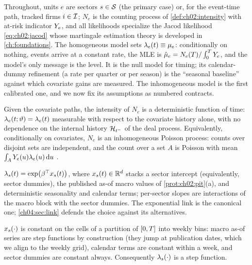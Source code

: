 Throughout, units $e$ are sectors $s \in \mathcal{S}$ (the primary case) or,
for the event-time path, tracked firms $i \in \mathcal{I}$; $N_e$ is the
counting process of \cref{def:ch02:intensity} with at-risk indicator
$Y_e$, and all likelihoods specialize the Jacod likelihood
\cref{eq:ch02:jacod} whose martingale estimation theory is developed in
\cref{ch:foundations}. The homogeneous model sets $\lambda_e(t) \equiv \mu_e$:
conditionally on nothing, events arrive at a constant rate, the MLE is
$\hat{\mu}_e = N_e(T) / \int_0^{T}Y_e$, and the model's only
message is the level. It is the null model for timing; its
calendar-dummy refinement (a rate per quarter or per season) is the
``seasonal baseline'' against which covariate gains are measured.
The inhomogeneous model is the first calibrated one, and we now fix its
assumptions as numbered contracts.

\begin{assumption}\label{asm:ch04:condpoisson}
Given the covariate paths, the intensity of $N_e$ is a deterministic
function of time: $\lambda_e(t;\vartheta) = \lambda_e(t)$ measurable with
respect to the covariate history alone, with no dependence on the internal
history $\mathcal{H}_{t^-}$ of the deal process. Equivalently, conditionally on
covariates, $N_e$ is an inhomogeneous Poisson process: counts over disjoint
sets are independent, and the count over a set $A$ is Poisson with mean
$\int_A Y_e(u)\lambda_e(u)\,\mathrm{d} u$ \citep{kingman1993,daley2003}.
\end{assumption}

\begin{assumption}\label{asm:ch04:loglin}
$\lambda_s(t) = \exp\!\big(\beta^{\top} x_s(t)\big)$, where $x_s(t) \in
\mathbb{R}^{d}$ stacks a sector intercept (equivalently, sector dummies), the
published as-of macro values of \cref{prot:ch02:pit}(a), and deterministic
seasonality and calendar terms; per-sector slopes are interactions of the
macro block with the sector dummies. The exponential link is the canonical
one; \cref{ch04:sec:link} defends the choice against its alternatives.
\end{assumption}

\begin{assumption}\label{asm:ch04:pwconst}
$x_s(\cdot)$ is constant on the cells of a partition of $[0,T]$
into weekly bins: macro as-of series are step functions by construction
(they jump at publication dates, which we align to the weekly grid),
calendar terms are constant within a week, and sector dummies are constant
always. Consequently $\lambda_s(\cdot)$ is a step function.
\end{assumption}

